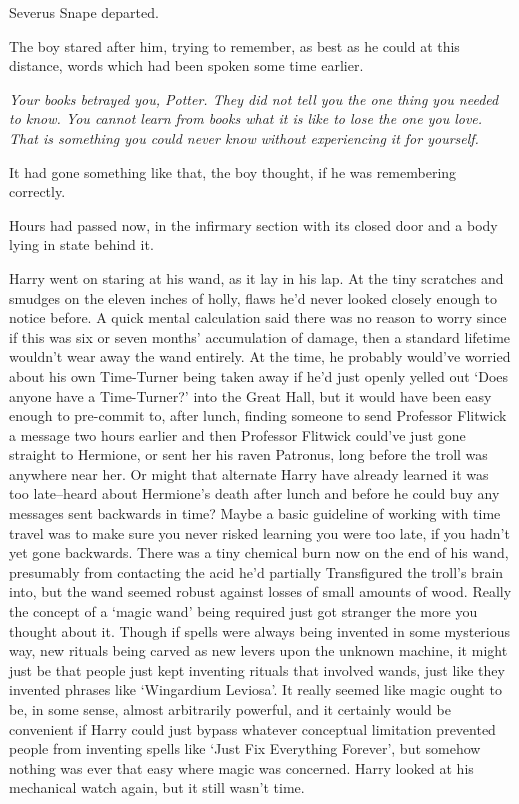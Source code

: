 Severus Snape departed.

The boy stared after him, trying to remember, as best as he could at this distance, words which had been spoken some time earlier.

\emph{Your books betrayed you, Potter. They did not tell you the one thing you needed to know. You cannot learn from books what it is like to lose the one you love. That is something you could never know without experiencing it for yourself.}

It had gone something like that, the boy thought, if he was remembering correctly.

\later

Hours had passed now, in the infirmary section with its closed door and a body lying in state behind it.

Harry went on staring at his wand, as it lay in his lap. At the tiny scratches and smudges on the eleven inches of holly, flaws he'd never looked closely enough to notice before. A quick mental calculation said there was no reason to worry since if this was six or seven months' accumulation of damage, then a standard lifetime wouldn't wear away the wand entirely. At the time, he probably would've worried about his own Time-Turner being taken away if he'd just openly yelled out `Does anyone have a Time-Turner?' into the Great Hall, but it would have been easy enough to pre-commit to, after lunch, finding someone to send Professor Flitwick a message two hours earlier and then Professor Flitwick could've just gone straight to Hermione, or sent her his raven Patronus, long before the troll was anywhere near her. Or might that alternate Harry have already learned it was too late\---heard about Hermione's death after lunch and before he could buy any messages sent backwards in time? Maybe a basic guideline of working with time travel was to make sure you never risked learning you were too late, if you hadn't yet gone backwards. There was a tiny chemical burn now on the end of his wand, presumably from contacting the acid he'd partially Transfigured the troll's brain into, but the wand seemed robust against losses of small amounts of wood. Really the concept of a `magic wand' being required just got stranger the more you thought about it. Though if spells were always being invented in some mysterious way, new rituals being carved as new levers upon the unknown machine, it might just be that people just kept inventing rituals that involved wands, just like they invented phrases like `Wingardium Leviosa'. It really seemed like magic ought to be, in some sense, almost arbitrarily powerful, and it certainly would be convenient if Harry could just bypass whatever conceptual limitation prevented people from inventing spells like `Just Fix Everything Forever', but somehow nothing was ever that easy where magic was concerned. Harry looked at his mechanical watch again, but it still wasn't time.

